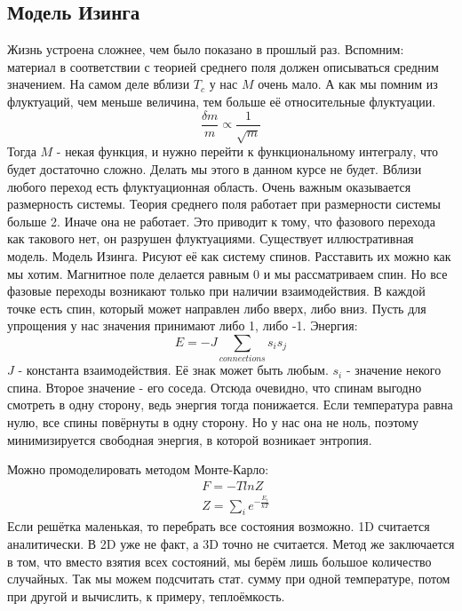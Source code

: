 \documentclass[a4paper, 12pt]{article}
\begin{document}
	\subsection{Модель Изинга}
	Жизнь устроена сложнее, чем было показано в прошлый раз. Вспомним: материал в соответствии с теорией среднего поля должен описываться средним значением. На самом деле вблизи $T_{c}$ у нас $M$ очень мало. А как мы помним из флуктуаций, чем меньше величина, тем больше её относительные флуктуации.
	\begin{equation*}
		\frac{\delta m}{m} \propto \frac{1}{\sqrt{m}}
	\end{equation*}
	Тогда $M$ - некая функция, и нужно перейти к функциональному интегралу, что будет достаточно сложно. Делать мы этого в данном курсе не будет. Вблизи любого переход есть флуктуационная область. Очень важным оказывается размерность системы. Теория среднего поля работает при размерности системы больше 2. Иначе она не работает. Это приводит к тому, что фазового перехода как такового нет, он разрушен флуктуациями. Существует иллюстративная модель. Модель Изинга. Рисуют её как систему спинов. Расставить их можно как мы хотим. Магнитное поле делается равным 0 и мы рассматриваем спин. Но все фазовые переходы возникают только при наличии взаимодействия. В каждой точке есть спин, который может направлен либо вверх, либо вниз. Пусть для упрощения у нас значения принимают либо 1, либо -1.  Энергия:
	\begin{equation*}
		E = - J \sum_{connections} s_{i} s_{j}
	\end{equation*}
	$J$ - константа взаимодействия. Её знак может быть любым. $s_{i}$ - значение некого спина. Второе значение - его соседа. Отсюда очевидно, что спинам выгодно смотреть в одну сторону, ведь энергия тогда понижается. Если температура равна нулю, все спины повёрнуты в одну сторону. Но у нас она не ноль, поэтому минимизируется свободная энергия, в которой возникает энтропия.
	
	Можно промоделировать методом Монте-Карло:
	\begin{equation*}
		\begin{aligned}
			& F = - T lnZ                        \\
			& Z = \sum_{i} e^{-\frac{E_{i}}{kT}} 
		\end{aligned}
	\end{equation*}
	Если решётка маленькая, то перебрать все состояния возможно. 1D считается аналитически. В 2D уже не факт, а 3D точно не считается. Метод же заключается в том, что вместо взятия всех состояний, мы берём лишь большое количество случайных. Так мы можем подсчитать стат. сумму при одной температуре, потом при другой и вычислить, к примеру, теплоёмкость.
	
\end{document}
